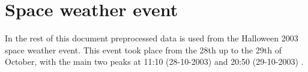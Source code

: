 
\section{Space weather event}
In the rest of this document preprocessed data is used from the Halloween 2003 space weather event. This event took place from the 28th up to the 29th of October, with the main two peaks at 11:10 (28-10-2003) and 20:50 (29-10-2003) \cite{wiki_halloween_solar_stroms}.







